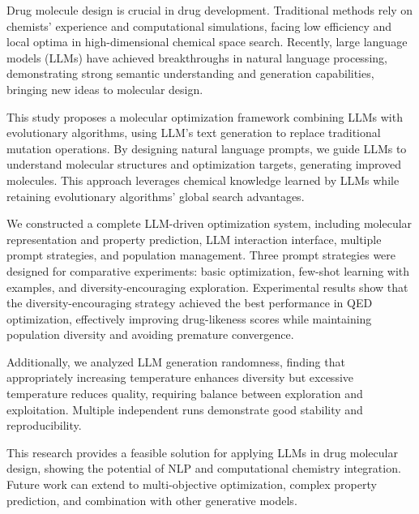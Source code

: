 Drug molecule design is crucial in drug development. Traditional methods rely on chemists' experience and computational simulations, facing low efficiency and local optima in high-dimensional chemical space search. Recently, large language models (LLMs) have achieved breakthroughs in natural language processing, demonstrating strong semantic understanding and generation capabilities, bringing new ideas to molecular design.

This study proposes a molecular optimization framework combining LLMs with evolutionary algorithms, using LLM's text generation to replace traditional mutation operations. By designing natural language prompts, we guide LLMs to understand molecular structures and optimization targets, generating improved molecules. This approach leverages chemical knowledge learned by LLMs while retaining evolutionary algorithms' global search advantages.

We constructed a complete LLM-driven optimization system, including molecular representation and property prediction, LLM interaction interface, multiple prompt strategies, and population management. Three prompt strategies were designed for comparative experiments: basic optimization, few-shot learning with examples, and diversity-encouraging exploration. Experimental results show that the diversity-encouraging strategy achieved the best performance in QED optimization, effectively improving drug-likeness scores while maintaining population diversity and avoiding premature convergence.

Additionally, we analyzed LLM generation randomness, finding that appropriately increasing temperature enhances diversity but excessive temperature reduces quality, requiring balance between exploration and exploitation. Multiple independent runs demonstrate good stability and reproducibility.

This research provides a feasible solution for applying LLMs in drug molecular design, showing the potential of NLP and computational chemistry integration. Future work can extend to multi-objective optimization, complex property prediction, and combination with other generative models.

\vspace{0.75cm}


\newpage
